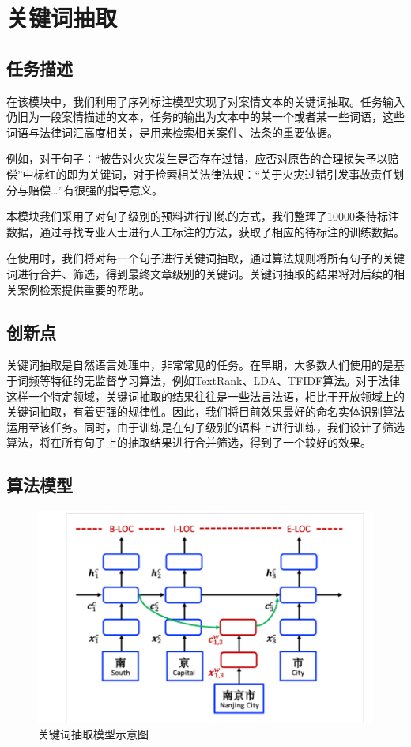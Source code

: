 \section{关键词抽取}
\subsection{任务描述}
在该模块中，我们利用了序列标注模型实现了对案情文本的关键词抽取。任务输入仍旧为一段案情描述的文本，任务的输出为文本中的某一个或者某一些词语，这些词语与法律词汇高度相关，是用来检索相关案件、法条的重要依据。

例如，对于句子：“被告对{\color{red}火灾}发生是否存在{\color{red}过错}，应否对原告的合理损失予以{\color{red}赔偿}”中标红的即为关键词，对于检索相关法律法规：“关于{\color{red}火灾过错}引发事故责任划分与{\color{red}赔偿}…”有很强的指导意义。

本模块我们采用了对句子级别的预料进行训练的方式，我们整理了10000条待标注数据，通过寻找专业人士进行人工标注的方法，获取了相应的待标注的训练数据。

在使用时，我们将对每一个句子进行关键词抽取，通过算法规则将所有句子的关键词进行合并、筛选，得到最终文章级别的关键词。关键词抽取的结果将对后续的相关案例检索提供重要的帮助。

\subsection{创新点}

关键词抽取是自然语言处理中，非常常见的任务。在早期，大多数人们使用的是基于词频等特征的无监督学习算法，例如TextRank、LDA、TFIDF算法。对于法律这样一个特定领域，关键词抽取的结果往往是一些法言法语，相比于开放领域上的关键词抽取，有着更强的规律性。因此，我们将目前效果最好的命名实体识别算法运用至该任务。同时，由于训练是在句子级别的语料上进行训练，我们设计了筛选算法，将在所有句子上的抽取结果进行合并筛选，得到了一个较好的效果。

\subsection{算法模型}

\begin{figure}[ht]
    \centering
    \includegraphics[width=\linewidth]{figures/model2}
    \caption{关键词抽取模型示意图}
    \label{fig:model2}
\end{figure}

